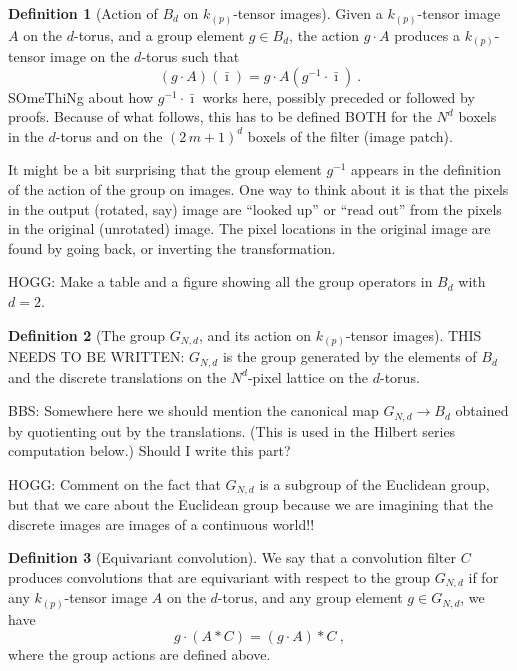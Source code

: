 \documentclass{article}
\theoremstyle{definition}
\newtheorem{definition}{Definition}
\newcommand{\tensorname}[2]{{#1}_{(#2)}}
\newcommand{\tensor}[2]{$\tensorname{#1}{#2}$-tensor}
\begin{document}
\begin{definition}[Action of $B_d$ on \tensor{k}{p} images]
Given a \tensor{k}{p} image $A$ on the $d$-torus, and a group element $g\in B_d$, the action $g\cdot A$ produces a \tensor{k}{p} image on the $d$-torus such that
\begin{equation}
    (g\cdot A)(\bar\imath) = g\cdot A({g^{-1}\cdot \bar\imath}) ~.
\end{equation}
SOmeThiNg about how $g^{-1}\cdot\bar\imath$ works here, possibly preceded or followed by proofs. Because of what follows, this has to be defined BOTH for the $N^d$ boxels in the $d$-torus and on the $(2\,m+1)^d$ boxels of the filter (image patch).
\end{definition}

It might be a bit surprising that the group element $g^{-1}$ appears in the definition of the action of the group on images.
One way to think about it is that the pixels in the output (rotated, say) image are ``looked up'' or ``read out'' from the pixels in the original (unrotated) image.
The pixel locations in the original image are found by going back, or inverting the transformation.

HOGG: Make a table and a figure showing all the group operators in $B_d$ with $d=2$.

\begin{definition}[The group $G_{N,d}$, and its action on \tensor{k}{p} images]\label{def:GdN}
THIS NEEDS TO BE WRITTEN: $G_{N,d}$ is the group generated by the elements of $B_d$ and the discrete translations on the $N^d$-pixel lattice on the $d$-torus.
\end{definition}

BBS: Somewhere here we should mention the canonical map $G_{N,d} \rightarrow B_d$ obtained by quotienting out by the translations. (This is used in the Hilbert series computation below.) Should I write this part?

HOGG: Comment on the fact that $G_{N,d}$ is a subgroup of the Euclidean group, but that we care about the Euclidean group because we are imagining that the discrete images are images of a continuous world!!

\begin{definition}[Equivariant convolution]\label{def:GNd equivariant}
We say that a convolution filter $C$ produces convolutions that are equivariant with respect to the group $G_{N,d}$ if for any \tensor{k}{p} image $A$ on the $d$-torus, and any group element $g\in G_{N,d}$, we have
\begin{equation}
    g\cdot (A\ast C) = (g\cdot A)\ast C ~,
\end{equation}
where the group actions are defined above.
\end{definition}
\end{document}
